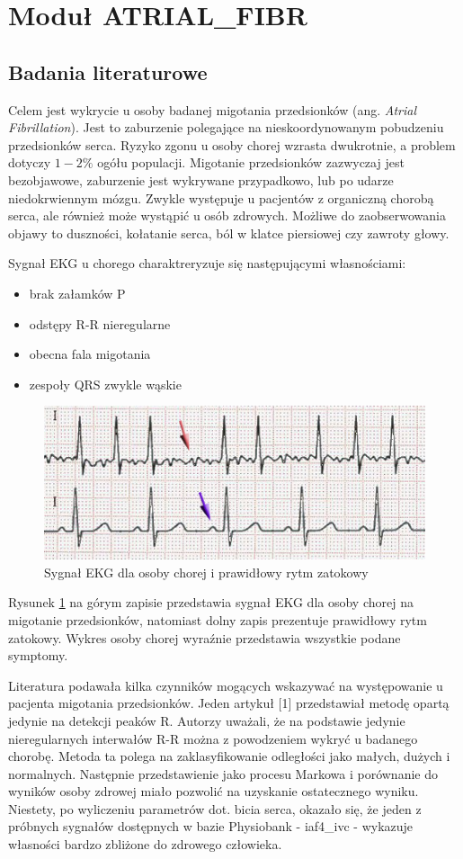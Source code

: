 \section{Moduł ATRIAL\_FIBR}
\subsection{Badania literaturowe}
Celem jest wykrycie u osoby badanej migotania przedsionków (ang. \textit{Atrial Fibrillation}). 
Jest to zaburzenie polegające na nieskoordynowanym pobudzeniu przedsionków serca. 
Ryzyko zgonu u osoby chorej wzrasta dwukrotnie, a problem dotyczy $1-2\%$ ogółu populacji.
Migotanie przedsionków zazwyczaj jest bezobjawowe, zaburzenie jest wykrywane przypadkowo,
lub po udarze niedokrwiennym mózgu.
Zwykle występuje u pacjentów z organiczną chorobą serca, ale również może wystąpić u osób zdrowych.
Możliwe do zaobserwowania objawy to duszności, kołatanie serca, ból w klatce piersiowej czy zawroty głowy.

Sygnał EKG u chorego charaktreryzuje się następującymi własnościami:
\begin{itemize}
  \item brak załamków P
  \item odstępy R-R nieregularne
  \item obecna fala migotania
  \item zespoły QRS zwykle wąskie
\end{itemize}
\begin{figure}[ht]
\centering
\includegraphics{ATRIAL_FIBR/img/AF_ecg}
\caption{Sygnał EKG dla osoby chorej i prawidłowy rytm zatokowy} \label{fig:AF_ecg}
\end{figure}

Rysunek \ref{fig:AF_ecg} na górym zapisie przedstawia sygnał EKG dla osoby chorej na migotanie przedsionków,
natomiast dolny zapis prezentuje prawidłowy rytm zatokowy.
Wykres osoby chorej wyraźnie przedstawia wszystkie podane symptomy.

Literatura podawała kilka czynników mogących wskazywać na występowanie u pacjenta migotania przedsionków. 
Jeden artykuł [1] przedstawiał metodę opartą jedynie na detekcji peaków R. 
Autorzy uważali, że na podstawie jedynie nieregularnych interwałów R-R 
można z powodzeniem wykryć u badanego chorobę. 
Metoda ta polega na zaklasyfikowanie odległości jako małych, dużych i normalnych. 
Następnie przedstawienie jako procesu Markowa i porównanie do wyników osoby zdrowej miało pozwolić 
na uzyskanie ostatecznego wyniku.
Niestety, po wyliczeniu parametrów dot. bicia serca, 
okazało się, że jeden z próbnych sygnałów dostępnych w bazie Physiobank - 
iaf4\_ivc - wykazuje własności bardzo zbliżone do zdrowego człowieka.

